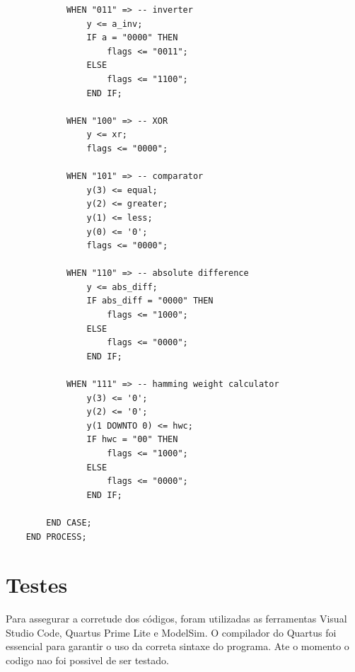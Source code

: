 \documentclass[12pt]{article}
\begin{document}
\begin{verbatim}
            WHEN "011" => -- inverter
                y <= a_inv;
                IF a = "0000" THEN
                    flags <= "0011";
                ELSE
                    flags <= "1100";
                END IF;

            WHEN "100" => -- XOR
                y <= xr;
                flags <= "0000";

            WHEN "101" => -- comparator
                y(3) <= equal;
                y(2) <= greater;
                y(1) <= less;
                y(0) <= '0';
                flags <= "0000";

            WHEN "110" => -- absolute difference
                y <= abs_diff;
                IF abs_diff = "0000" THEN
                    flags <= "1000";
                ELSE
                    flags <= "0000";
                END IF;

            WHEN "111" => -- hamming weight calculator
                y(3) <= '0';
                y(2) <= '0';
                y(1 DOWNTO 0) <= hwc;
                IF hwc = "00" THEN
                    flags <= "1000";
                ELSE
                    flags <= "0000";
                END IF;

        END CASE;
    END PROCESS;
\end{verbatim}

\section{Testes}

Para assegurar a corretude dos códigos, foram utilizadas as ferramentas Visual Studio Code, Quartus Prime Lite e ModelSim. O compilador do Quartus foi essencial para garantir o uso da correta sintaxe do programa. Ate o momento o codigo nao foi possivel de ser testado.
\end{document}
